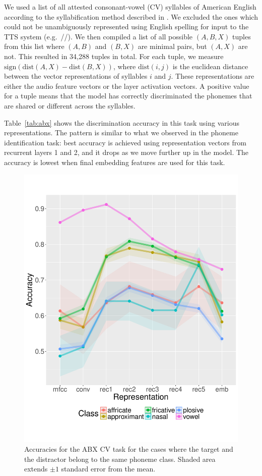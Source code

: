 We used a list of all attested consonant-vowel (CV) syllables of American English according to 
the syllabification method described in \citet{Gorman2013}. We excluded the ones which could 
not be unambiguously represented using English spelling for input to the TTS system 
(e.g.\ //). We then compiled a list of all possible $(A, B, X)$ tuples from this list 
where $(A,B)$ and $(B,X)$ are minimal pairs, but $(A,X)$ are not. 
This resulted in 34,288 tuples in total. For each tuple, we measure 
$\mathrm{sign}(\mathrm{dist}(A,X) - \mathrm{dist}(B,X))$, where $\mathrm{dist}(i,j)$ is the 
euclidean distance between the vector 
representations of syllables $i$ and $j$. These representations are either the audio feature 
vectors or the layer activation vectors. A positive value for a tuple means that the model has 
correctly discriminated the phonemes that are shared or different across the syllables.

Table~\ref{tab:abx} shows the discrimination accuracy in this task using various representations. 
The pattern is similar to what we observed in the phoneme identification task: best accuracy is 
achieved using representation vectors from recurrent layers 1 and 2, and it drops as we move 
further up in the model. The accuracy is lowest when final embedding features are used for this task. 




\begin{figure}[t]
  \centering
  \includegraphics[scale=0.3]{figures/abx_cv_same.pdf}
  \caption{Accuracies for the ABX CV task for the cases where the target
    and the distractor belong to the same phoneme class. Shaded area
    extends $\pm1$ standard error from the mean.}
  \label{fig:abx_cv_same}
\end{figure}

